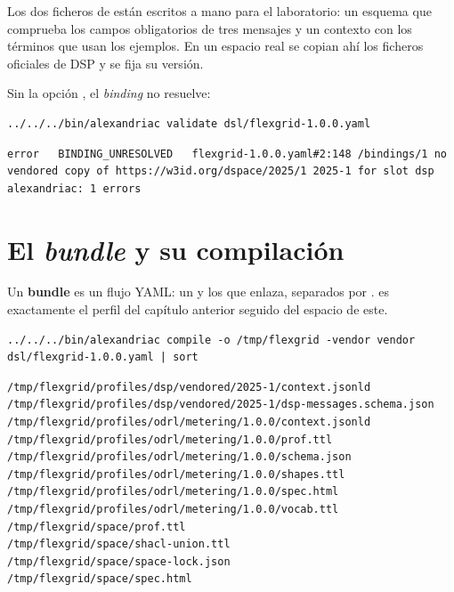 \begin{notaPractica}
Los dos ficheros de  están escritos a mano para el laboratorio: un esquema que
comprueba los campos obligatorios de tres mensajes y un contexto con los términos que usan los ejemplos. En un
espacio real se copian ahí los ficheros oficiales de DSP y se fija su versión.
\end{notaPractica}

Sin la opción , el \emph{binding} no resuelve:

\begin{lstlisting}[style=sh]
../../../bin/alexandriac validate dsl/flexgrid-1.0.0.yaml
\end{lstlisting}
\begin{lstlisting}[style=out]
error   BINDING_UNRESOLVED   flexgrid-1.0.0.yaml#2:148 /bindings/1 no vendored copy of https://w3id.org/dspace/2025/1 2025-1 for slot dsp
alexandriac: 1 errors
\end{lstlisting}

\section{El \emph{bundle} y su compilación}

Un \textbf{bundle} es un flujo YAML: un  y los  que enlaza, separados por
\cod{---}.  es exactamente el perfil del capítulo anterior seguido del
espacio de este.

\begin{lstlisting}[style=sh]
../../../bin/alexandriac compile -o /tmp/flexgrid -vendor vendor dsl/flexgrid-1.0.0.yaml | sort
\end{lstlisting}
\begin{lstlisting}[style=out]
/tmp/flexgrid/profiles/dsp/vendored/2025-1/context.jsonld
/tmp/flexgrid/profiles/dsp/vendored/2025-1/dsp-messages.schema.json
/tmp/flexgrid/profiles/odrl/metering/1.0.0/context.jsonld
/tmp/flexgrid/profiles/odrl/metering/1.0.0/prof.ttl
/tmp/flexgrid/profiles/odrl/metering/1.0.0/schema.json
/tmp/flexgrid/profiles/odrl/metering/1.0.0/shapes.ttl
/tmp/flexgrid/profiles/odrl/metering/1.0.0/spec.html
/tmp/flexgrid/profiles/odrl/metering/1.0.0/vocab.ttl
/tmp/flexgrid/space/prof.ttl
/tmp/flexgrid/space/shacl-union.ttl
/tmp/flexgrid/space/space-lock.json
/tmp/flexgrid/space/spec.html
\end{lstlisting}

